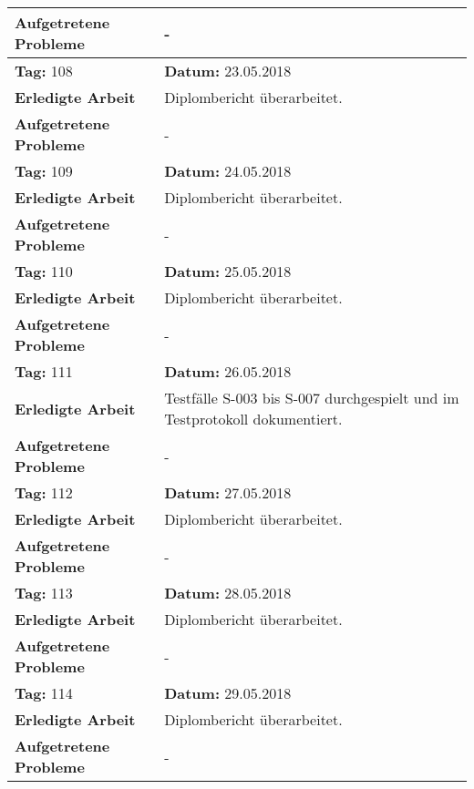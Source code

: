 \begin{longtable}{|p{5cm}|p{5cm}p{6cm}|}
\textbf{Aufgetretene Probleme} & \multicolumn{2}{p{11cm}|}{-} \\ \hline
\rowcolor{heading}\textbf{Tag:} 108 & \textbf{Datum:} 23.05.2018 & \\ \hline
\textbf{Erledigte Arbeit} & \multicolumn{2}{p{11cm}|}{Diplombericht überarbeitet.} \\ \hline
\textbf{Aufgetretene Probleme} & \multicolumn{2}{p{11cm}|}{-} \\ \hline
\rowcolor{heading}\textbf{Tag:} 109 & \textbf{Datum:} 24.05.2018 & \\ \hline
\textbf{Erledigte Arbeit} & \multicolumn{2}{p{11cm}|}{Diplombericht überarbeitet.} \\ \hline
\textbf{Aufgetretene Probleme} & \multicolumn{2}{p{11cm}|}{-} \\ \hline
\rowcolor{heading}\textbf{Tag:} 110 & \textbf{Datum:} 25.05.2018 & \\ \hline
\textbf{Erledigte Arbeit} & \multicolumn{2}{p{11cm}|}{Diplombericht überarbeitet.} \\ \hline
\textbf{Aufgetretene Probleme} & \multicolumn{2}{p{11cm}|}{-} \\ \hline
\rowcolor{heading}\textbf{Tag:} 111 & \textbf{Datum:} 26.05.2018 & \\ \hline
\textbf{Erledigte Arbeit} & \multicolumn{2}{p{11cm}|}{Testfälle S-003 bis S-007 durchgespielt und im Testprotokoll dokumentiert.} \\ \hline
\textbf{Aufgetretene Probleme} & \multicolumn{2}{p{11cm}|}{-} \\ \hline
\rowcolor{heading}\textbf{Tag:} 112 & \textbf{Datum:} 27.05.2018 & \\ \hline
\textbf{Erledigte Arbeit} & \multicolumn{2}{p{11cm}|}{Diplombericht überarbeitet.} \\ \hline
\textbf{Aufgetretene Probleme} & \multicolumn{2}{p{11cm}|}{-} \\ \hline
\rowcolor{heading}\textbf{Tag:} 113 & \textbf{Datum:} 28.05.2018 & \\ \hline
\textbf{Erledigte Arbeit} & \multicolumn{2}{p{11cm}|}{Diplombericht überarbeitet.} \\ \hline
\textbf{Aufgetretene Probleme} & \multicolumn{2}{p{11cm}|}{-} \\ \hline
\rowcolor{heading}\textbf{Tag:} 114 & \textbf{Datum:} 29.05.2018 & \\ \hline
\textbf{Erledigte Arbeit} & \multicolumn{2}{p{11cm}|}{Diplombericht überarbeitet.} \\ \hline
\textbf{Aufgetretene Probleme} & \multicolumn{2}{p{11cm}|}{-} \\ \hline

\end{longtable}
